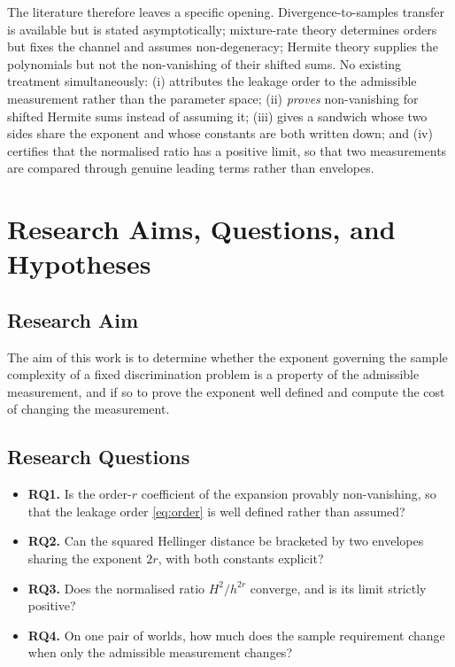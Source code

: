 The literature therefore leaves a specific opening. Divergence-to-samples transfer is
available but is stated asymptotically; mixture-rate theory determines orders but fixes the
channel and assumes non-degeneracy; Hermite theory supplies the polynomials but not the
non-vanishing of their shifted sums. No existing treatment simultaneously: (i) attributes
the leakage order to the admissible measurement rather than the parameter space;
(ii) \emph{proves} non-vanishing for shifted Hermite sums instead of assuming it;
(iii) gives a sandwich whose two sides share the exponent and whose constants are both
written down; and (iv) certifies that the normalised ratio has a positive limit, so that two
measurements are compared through genuine leading terms rather than envelopes.

\section{Research Aims, Questions, and Hypotheses}

\subsection{Research Aim}

The aim of this work is to determine whether the exponent governing the sample complexity of
a fixed discrimination problem is a property of the admissible measurement, and if so to
prove the exponent well defined and compute the cost of changing the measurement.

\subsection{Research Questions}

\begin{itemize}
\item \textbf{RQ1.} Is the order-$r$ coefficient of the expansion provably non-vanishing, so
that the leakage order \eqref{eq:order} is well defined rather than assumed?
\item \textbf{RQ2.} Can the squared Hellinger distance be bracketed by two envelopes sharing
the exponent $2r$, with both constants explicit?
\item \textbf{RQ3.} Does the normalised ratio $H^{2}/h^{2r}$ converge, and is its limit
strictly positive?
\item \textbf{RQ4.} On one pair of worlds, how much does the sample requirement change when
only the admissible measurement changes?
\end{itemize}

